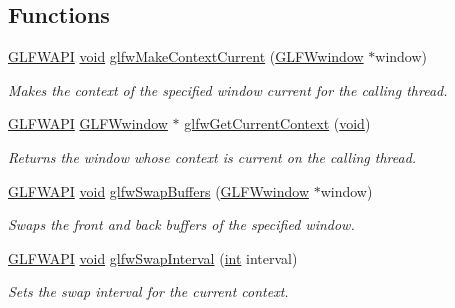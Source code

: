 \subsection*{Functions}
\begin{DoxyCompactItemize}
\item 
\hyperlink{glfw3_8h_a56da5036b2cc259351ae22fd6439bb47}{G\-L\-F\-W\-A\-P\-I} \hyperlink{wglew_8h_aeea6e3dfae3acf232096f57d2d57f084}{void} \hyperlink{group__context_gafd76c93e15ec8b0b90506a9936a46185}{glfw\-Make\-Context\-Current} (\hyperlink{group__window_ga3c96d80d363e67d13a41b5d1821f3242}{G\-L\-F\-Wwindow} $\ast$window)
\begin{DoxyCompactList}\small\item\em Makes the context of the specified window current for the calling thread. \end{DoxyCompactList}\item 
\hyperlink{glfw3_8h_a56da5036b2cc259351ae22fd6439bb47}{G\-L\-F\-W\-A\-P\-I} \hyperlink{group__window_ga3c96d80d363e67d13a41b5d1821f3242}{G\-L\-F\-Wwindow} $\ast$ \hyperlink{group__context_gac28d98c655377d81a516bf5ef90780c8}{glfw\-Get\-Current\-Context} (\hyperlink{wglew_8h_aeea6e3dfae3acf232096f57d2d57f084}{void})
\begin{DoxyCompactList}\small\item\em Returns the window whose context is current on the calling thread. \end{DoxyCompactList}\item 
\hyperlink{glfw3_8h_a56da5036b2cc259351ae22fd6439bb47}{G\-L\-F\-W\-A\-P\-I} \hyperlink{wglew_8h_aeea6e3dfae3acf232096f57d2d57f084}{void} \hyperlink{group__context_gafb827800eedbfcbc97b1e5408df668d7}{glfw\-Swap\-Buffers} (\hyperlink{group__window_ga3c96d80d363e67d13a41b5d1821f3242}{G\-L\-F\-Wwindow} $\ast$window)
\begin{DoxyCompactList}\small\item\em Swaps the front and back buffers of the specified window. \end{DoxyCompactList}\item 
\hyperlink{glfw3_8h_a56da5036b2cc259351ae22fd6439bb47}{G\-L\-F\-W\-A\-P\-I} \hyperlink{wglew_8h_aeea6e3dfae3acf232096f57d2d57f084}{void} \hyperlink{group__context_ga12a595c06947cec4967c6e1f14210a8a}{glfw\-Swap\-Interval} (\hyperlink{wglew_8h_a500a82aecba06f4550f6849b8099ca21}{int} interval)
\begin{DoxyCompactList}\small\item\em Sets the swap interval for the current context. \end{DoxyCompactList}\item 

\end{DoxyCompactItemize}
